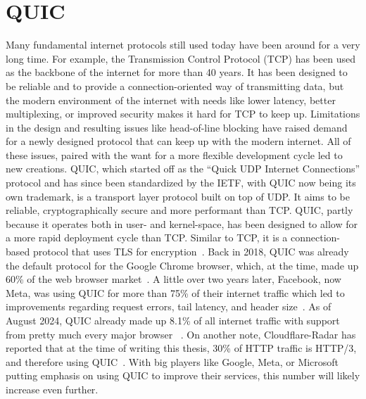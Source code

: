\section{QUIC}\label{sec:quic_bg}
Many fundamental internet protocols still used today have been around for 
a very long time.
For example, the Transmission Control Protocol (TCP) has been used as the backbone
of the internet for more than 40 years.
It has been designed to be reliable and to provide a connection-oriented
way of transmitting data, but the modern environment of the internet with
needs like lower latency, better multiplexing, or improved security makes it 
hard for TCP to keep up.
Limitations in the design and resulting issues like head-of-line blocking
have raised demand for a newly designed protocol that can keep up with the
modern internet. %
All of these issues, paired with the want for a more flexible development cycle
led to new creations.
QUIC, which started off as the ``Quick UDP Internet Connections'' protocol and has 
since been standardized by the IETF, with QUIC now being its own trademark, is a 
transport layer protocol built on top of UDP\@.
It aims to be reliable, 
cryptographically secure and more performant than TCP\@.
QUIC, partly because it operates both in user- and kernel-space, has been designed to allow for a 
more rapid deployment cycle than TCP\@.
Similar to TCP, it is a connection-based protocol that uses TLS for encryption~\parencite{quic-explained}.
Back in 2018, QUIC was already the default protocol for the Google Chrome browser, which,
at the time, made up 60\% of the web browser market~\parencite{google-quic-usage}.
A little over two years later, Facebook, now Meta, was using QUIC for more than 75\% of 
their internet traffic which led to improvements regarding
request errors, tail latency, and header size~\parencite{facebook-quic-usage}.
As of August 2024, QUIC already made up 8.1\% of all internet traffic %
with support from pretty much every major browser
~\parencite{internet-quic-usage, article-quic-usage}.
On another note, Cloudflare-Radar has reported that at the time of writing this thesis, 
30\% of HTTP traffic is HTTP/3, and therefore using QUIC~\parencite{cloudflare-radar}.
With big players like Google, Meta, or Microsoft putting emphasis on
using QUIC to improve their services, this number will likely increase even further.

